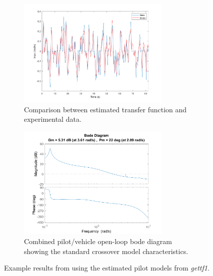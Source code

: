 \begin{figure}[p]
    \centering
    \begin{subfigure}{\textwidth}
        \centering
        \includegraphics[width=0.8\textwidth]{figures/Modeling/model_output.png}
        \caption[Comparison between estimated transfer function and experimental data]{Comparison between estimated transfer function and experimental data.}
        \label{fig:comparison}
    \end{subfigure}
    \hfill
    \begin{subfigure}{\textwidth}
        \centering
        \includegraphics[width=0.8\textwidth]{figures/Modeling/YpYc_204.png}
        \caption[Combined pilot/vehicle open-loop bode diagram]{Combined pilot/vehicle open-loop bode diagram showing the standard crossover model characteristics.}
        \label{fig:bode}
    \end{subfigure}
    \caption[Example results from using the estimated pilot models from \textit{gettf1}]{Example results from using the estimated pilot models from \textit{gettf1}.}
\end{figure}

